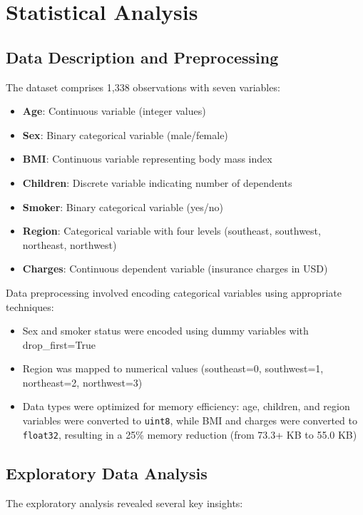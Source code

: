 \documentclass[12pt,a4paper]{article}
\begin{document}
\section{Statistical Analysis}

\subsection{Data Description and Preprocessing}

The dataset comprises 1,338 observations with seven variables:
\begin{itemize}
    \item \textbf{Age}: Continuous variable (integer values)
    \item \textbf{Sex}: Binary categorical variable (male/female)
    \item \textbf{BMI}: Continuous variable representing body mass index
    \item \textbf{Children}: Discrete variable indicating number of dependents
    \item \textbf{Smoker}: Binary categorical variable (yes/no)
    \item \textbf{Region}: Categorical variable with four levels (southeast, southwest, northeast, northwest)
    \item \textbf{Charges}: Continuous dependent variable (insurance charges in USD)
\end{itemize}

Data preprocessing involved encoding categorical variables using appropriate techniques:
\begin{itemize}
    \item Sex and smoker status were encoded using dummy variables with drop\_first=True
    \item Region was mapped to numerical values (southeast=0, southwest=1, northeast=2, northwest=3)
    \item Data types were optimized for memory efficiency: age, children, and region variables were converted to \texttt{uint8}, while BMI and charges were converted to \texttt{float32}, resulting in a 25\% memory reduction (from 73.3+ KB to 55.0 KB)
\end{itemize}

\subsection{Exploratory Data Analysis}

The exploratory analysis revealed several key insights:
\end{document}
